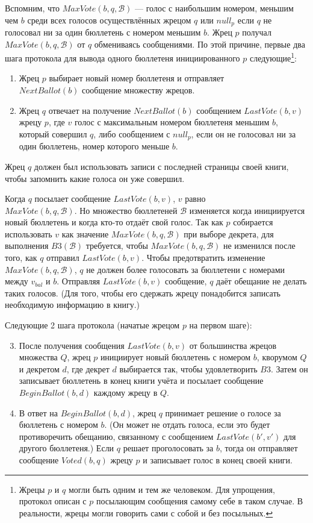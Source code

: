 \documentclass[12pt, a4paper]{article} %
\begin{document}
Вспомним, что $MaxVote(b, q, \mathcal{B})$ --- голос с наибольшим номером, меньшим чем $b$ среди всех голосов осуществлённых жрецом $q$ или $null_p$ если $q$ не голосовал ни за один бюллетень с номером меньшим $b$. Жрец $p$ получал $MaxVote(b, q, \mathcal{B})$ от $q$ обмениваясь сообщениями. По этой причине, первые два шага протокола для вывода одного бюллетеня инициированного $p$ следующие\footnote{Жрецы $p$ и $q$ могли быть одним и тем же человеком. Для упрощения, протокол описан с $p$ посылающим сообщения самому себе в таком случае. В реальности, жрецы могли говорить сами с собой и без посыльных.}:

\begin{enumerate}
    \item Жрец $p$ выбирает новый номер бюллетеня и отправляет \\$NextBallot(b)$ сообщение множеству жрецов.
    \item Жрец $q$ отвечает на получение $NextBallot(b)$ сообщением $LastVote(b, v)$ жрецу $p$, где $v$ голос с максимальным номером бюллетеня меньшим $b$, который совершил $q$, либо сообщением с $null_p$, если он не голосовал ни за один бюллетень, номер которого меньше $b$.
\end{enumerate}

Жрец $q$ должен был использовать записи с последней страницы своей книги, чтобы запомнить какие голоса он уже совершил.

Когда $q$ посылает сообщение $LastVote(b, v)$, $v$ равно\\
$MaxVote(b, q, \mathcal{B})$. Но множество бюллетеней $\mathcal{B}$ изменяется когда инициируется новый бюллетень и когда кто-то отдаёт свой голос. Так как $p$ собирается использовать $v$ как значение $MaxVote(b, q, \mathcal{B})$ при выборе декрета, для выполнения $B3(\mathcal{B})$ требуется, чтобы $MaxVote(b, q, \mathcal{B})$ не изменился после того, как $q$ отправил $LastVote(b, v)$. Чтобы предотвратить изменение $MaxVote(b, q, \mathcal{B})$, $q$ не должен более голосовать за бюллетени с номерами между $v_{bal}$ и $b$. Отправляя $LastVote(b, v)$ сообщение, $q$ даёт обещание не делать таких голосов. (Для того, чтобы его сдержать жрецу понадобится записать необходимую информацию в книгу.)

Следующие 2 шага протокола (начатые жрецом $p$ на первом шаге):
\begin{enumerate} \setcounter{enumi}{2}
    \item После получения сообщения $LastVote(b, v)$ от большинства жрецов множества $Q$, жрец $p$ инициирует новый бюллетень с номером $b$, кворумом $Q$ и декретом $d$, где декрет $d$ выбирается так, чтобы удовлетворить $B3$. Затем он записывает бюллетень в конец книги учёта и посылает сообщение $BeginBallot(b, d)$ каждому жрецу в $Q$.
    \item В ответ на $BeginBallot(b, d)$, жрец $q$ принимает решение о голосе за бюллетень с номером $b$. (Он может не отдать голоса, если это будет противоречить обещанию, связанному с сообщением $LastVote(b', v')$ для другого бюллетеня.) Если $q$ решает проголосовать за $b$, тогда он отправляет сообщение $Voted(b, q)$ жрецу $p$ и записывает голос в конец своей книги.
\end{enumerate}
\end{document}
